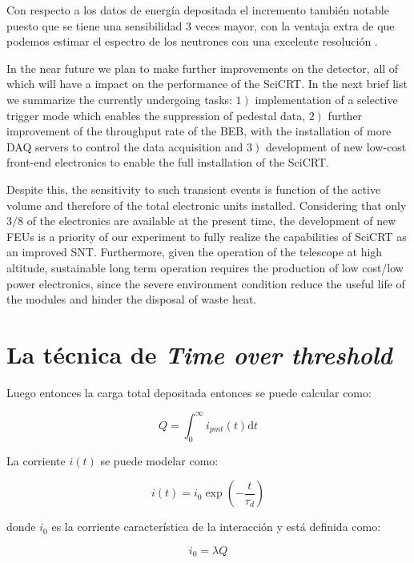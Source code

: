 Con respecto a los datos de energía depositada el incremento también notable puesto que se tiene una sensibilidad $3$ veces mayor, con la ventaja extra de que podemos estimar el espectro de los neutrones con una excelente resolución \cite{ysasai17}.

In the near future we plan to make further improvements on the detector, all of which will have a impact on the performance of the SciCRT. In the next brief list we summarize the currently undergoing tasks: $1\left.\right)$ implementation of a selective trigger mode which enables the suppression of pedestal data, $2\left.\right)$ further improvement of the throughput rate of the BEB, with the installation of more DAQ servers to control the data acquisition and $3\left.\right)$ development of new low-cost front-end electronics to enable the full installation of the SciCRT.

Despite this, the sensitivity to such transient events is function of the active volume and therefore of the total electronic units installed. Considering that only $3/8$ of the electronics are available at the present time, the development of new FEUs is a priority of our experiment to fully realize the capabilities of SciCRT as an improved SNT. Furthermore, given the operation of the telescope at high altitude, sustainable long term operation requires the production of low cost/low power electronics, since the severe environment condition reduce the useful life of the modules and hinder the disposal of waste heat.

\section{La técnica de \emph{Time over threshold}}

 Luego entonces la carga total depositada entonces se puede calcular como:

\begin{equation}
Q=\int_{0}^{\infty} i_{pmt}\left(t\right)\mathrm{d}t
\end{equation}

La corriente $i\left(t\right)$ se puede modelar como:

\begin{equation}
i\left(t\right)=i_{0} \exp\left(-\dfrac{t}{\tau_{d}}\right)
\end{equation}

donde $i_{0}$ es la corriente característica de la interacción y está definida como:

\begin{equation}
i_{0}=\lambda Q
\end{equation}


